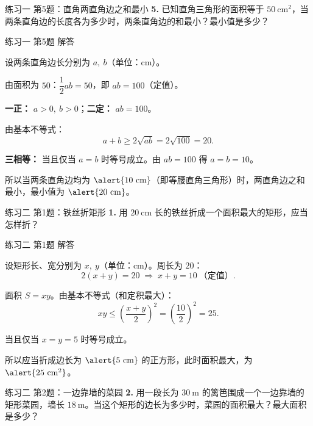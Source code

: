 \documentclass[10pt,aspectratio=169,serif]{beamer}
\begin{document}
\begin{frame}[t]{练习一 第5题：直角两直角边之和最小}
\textbf{5.} 已知直角三角形的面积等于 $50\ \mathrm{cm^2}$，当两条直角边的长度各为多少时，两条直角边的和最小？最小值是多少？
\end{frame}

\begin{frame}[t]{练习一 第5题 解答}
\begin{tcolorbox}[colback=orange!10,colframe=orange,title=\textbf{解}]
设两条直角边长分别为 $a,\ b$（单位：cm）。

由面积为 $50$：$\dfrac{1}{2}ab=50$，即 $ab=100$（定值）。

\textbf{一正：} $a>0,\ b>0$；\quad \textbf{二定：} $ab=100$。

由基本不等式：
\[
a+b \ge 2\sqrt{ab}=2\sqrt{100}=20.
\]

\textbf{三相等：} 当且仅当 $a=b$ 时等号成立。由 $ab=100$ 得 $a=b=10$。

\vspace{0.5em}
所以当两条直角边均为 $\alert{10\ \mathrm{cm}}$（即等腰直角三角形）时，两直角边之和最小，最小值为 $\alert{20\ \mathrm{cm}}$。
\end{tcolorbox}
\end{frame}

\begin{frame}[t]{练习二 第1题：铁丝折矩形}
\textbf{1.} 用 $20\ \mathrm{cm}$ 长的铁丝折成一个面积最大的矩形，应当怎样折？
\end{frame}

\begin{frame}[t]{练习二 第1题 解答}
\begin{tcolorbox}[colback=orange!10,colframe=orange,title=\textbf{解}]
设矩形长、宽分别为 $x,\ y$（单位：cm）。周长为 $20$：
\[
2(x+y)=20 \;\Longrightarrow\; x+y=10\ \text{（定值）}.
\]

面积 $S=xy$。由基本不等式（和定积最大）：
\[
xy \le \left(\frac{x+y}{2}\right)^2=\left(\frac{10}{2}\right)^2=25.
\]

当且仅当 $x=y=5$ 时等号成立。

\vspace{0.5em}
所以应当折成边长为 $\alert{5\ \mathrm{cm}}$ 的正方形，此时面积最大，为 $\alert{25\ \mathrm{cm^2}}$。
\end{tcolorbox}
\end{frame}

\begin{frame}[t]{练习二 第2题：一边靠墙的菜园}
\textbf{2.} 用一段长为 $30\ \mathrm{m}$ 的篱笆围成一个一边靠墙的矩形菜园，墙长 $18\ \mathrm{m}$。当这个矩形的边长为多少时，菜园的面积最大？最大面积是多少？
\end{frame}
\end{document}
